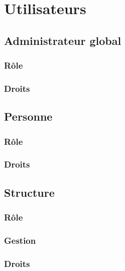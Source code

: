 \documentclass[11pt]{report}
\begin{document}
\chapter{Utilisateurs}
	
	\section{Administrateur global}
		\subsection{Rôle}
		\subsection{Droits}
	\section{Personne}
		\subsection{Rôle}
		\subsection{Droits}
	\section{Structure}
		\subsection{Rôle}
		\subsection{Gestion}
		\subsection{Droits}
\end{document}
